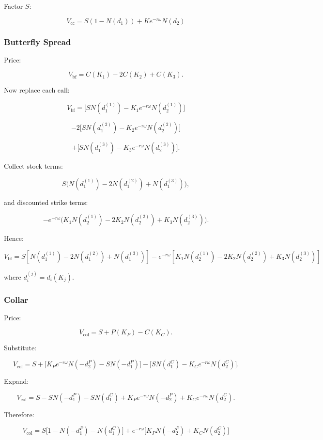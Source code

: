 \documentclass[11pt]{article}
\begin{document}
Factor $S$:

\[
\boxed{
V_{\text{cc}}
=
S(1-N(d_1))+Ke^{-r\omega}N(d_2)
}
\]

\subsubsection*{Butterfly Spread}

Price:

\[
V_{\text{bf}}=C(K_1)-2C(K_2)+C(K_3).
\]

Now replace each call:

\[
V_{\text{bf}}
=
\big[S N(d_1^{(1)})-K_1e^{-r\omega}N(d_2^{(1)})\big]
\]

\[
-2\big[S N(d_1^{(2)})-K_2e^{-r\omega}N(d_2^{(2)})\big]
\]

\[
+\big[S N(d_1^{(3)})-K_3e^{-r\omega}N(d_2^{(3)})\big].
\]

Collect stock terms:

\[
S\Big(N(d_1^{(1)})-2N(d_1^{(2)})+N(d_1^{(3)})\Big),
\]

and discounted strike terms:

\[
-e^{-r\omega}
\Big(
K_1N(d_2^{(1)})-2K_2N(d_2^{(2)})+K_3N(d_2^{(3)})
\Big).
\]

Hence:

\[
\boxed{
V_{\text{bf}}
=
S\left[N(d_1^{(1)})-2N(d_1^{(2)})+N(d_1^{(3)})\right]
-
e^{-r\omega}
\left[
K_1N(d_2^{(1)})-2K_2N(d_2^{(2)})+K_3N(d_2^{(3)})
\right]
}
\]

where $d_i^{(j)}=d_i(K_j)$.

\subsubsection*{Collar}

Price:

\[
V_{\text{col}}=S+P(K_P)-C(K_C).
\]

Substitute:

\[
V_{\text{col}}
=
S+\big[K_Pe^{-r\omega}N(-d_2^P)-SN(-d_1^P)\big]
-\big[SN(d_1^C)-K_Ce^{-r\omega}N(d_2^C)\big].
\]

Expand:

\[
V_{\text{col}}
=
S-SN(-d_1^P)-SN(d_1^C)
+K_Pe^{-r\omega}N(-d_2^P)
+K_Ce^{-r\omega}N(d_2^C).
\]

Therefore:

\[
\boxed{
V_{\text{col}}
=
S\big[1-N(-d_1^P)-N(d_1^C)\big]
+
e^{-r\omega}
\big[
K_PN(-d_2^P)+K_CN(d_2^C)
\big]
}
\]
\end{document}
